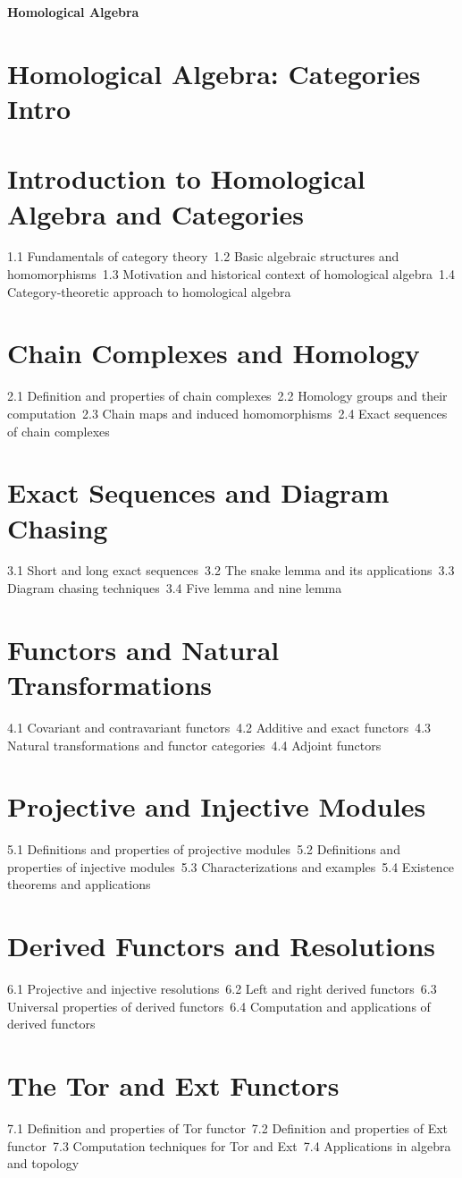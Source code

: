 {\LARGE \bf{Homological Algebra}}
\section{Homological Algebra: Categories Intro}
\section{Introduction to Homological Algebra and Categories}
1.1 Fundamentals of category theory\
1.2 Basic algebraic structures and homomorphisms\
1.3 Motivation and historical context of homological algebra\
1.4 Category-theoretic approach to homological algebra\
\section{Chain Complexes and Homology}
2.1 Definition and properties of chain complexes\
2.2 Homology groups and their computation\
2.3 Chain maps and induced homomorphisms\
2.4 Exact sequences of chain complexes\
\section{Exact Sequences and Diagram Chasing}
3.1 Short and long exact sequences\
3.2 The snake lemma and its applications\
3.3 Diagram chasing techniques\
3.4 Five lemma and nine lemma\
\section{Functors and Natural Transformations}
4.1 Covariant and contravariant functors\
4.2 Additive and exact functors\
4.3 Natural transformations and functor categories\
4.4 Adjoint functors\
\section{Projective and Injective Modules}
5.1 Definitions and properties of projective modules\
5.2 Definitions and properties of injective modules\
5.3 Characterizations and examples\
5.4 Existence theorems and applications\
\section{Derived Functors and Resolutions}
6.1 Projective and injective resolutions\
6.2 Left and right derived functors\
6.3 Universal properties of derived functors\
6.4 Computation and applications of derived functors\
\section{The Tor and Ext Functors}
7.1 Definition and properties of Tor functor\
7.2 Definition and properties of Ext functor\
7.3 Computation techniques for Tor and Ext\
7.4 Applications in algebra and topology\
